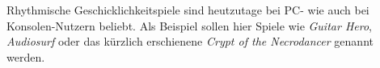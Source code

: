 
Rhythmische Geschicklichkeitspiele sind heutzutage bei PC- wie auch bei Konsolen-Nutzern beliebt. Als Beispiel sollen hier Spiele wie \textit{Guitar Hero}, \textit{Audiosurf} oder das kürzlich erschienene \textit{Crypt of the Necrodancer} genannt werden. 